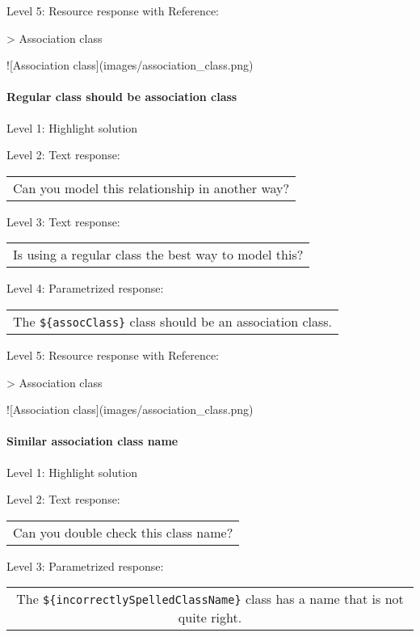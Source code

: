 \noindent Level 5: Resource response with Reference:

> Association class

![Association class](images/association_class.png)


\paragraph{Regular class should be association class}

\noindent Level 1: Highlight solution \medskip

\noindent Level 2: Text response: \medskip

\begin{tabular}{|c}
Can you model this relationship in another way?
\end{tabular} \medskip

\noindent Level 3: Text response: \medskip

\begin{tabular}{|c}
Is using a regular class the best way to model this?
\end{tabular} \medskip

\noindent Level 4: Parametrized response: \medskip

\begin{tabular}{|c}
The \verb|${assocClass}| class should be an association class.
\end{tabular} \medskip

\noindent Level 5: Resource response with Reference:

> Association class

![Association class](images/association_class.png)


\paragraph{Similar association class name}

\noindent Level 1: Highlight solution \medskip

\noindent Level 2: Text response: \medskip

\begin{tabular}{|c}
Can you double check this class name?
\end{tabular} \medskip

\noindent Level 3: Parametrized response: \medskip

\begin{tabular}{|c}
The \verb|${incorrectlySpelledClassName}| class has a name that is not quite right.
\end{tabular} \medskip

